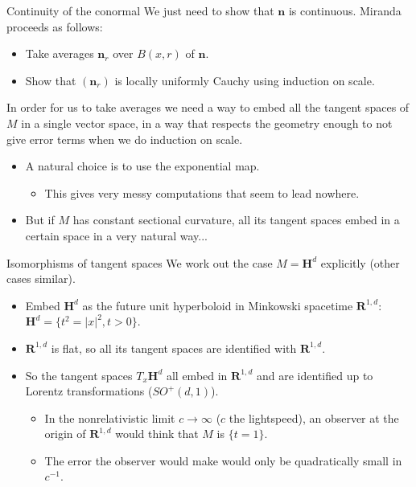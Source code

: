 \documentclass[10pt]{beamer}
\newcommand{\RR}{\mathbf{R}}
\newcommand{\Hyp}{\mathbf H}
\newcommand{\normal}{\mathbf n}
\begin{document}
\begin{frame}{Continuity of the conormal}
We just need to show that $\normal$ is continuous.
Miranda proceeds as follows:

\begin{itemize}
\item Take averages $\normal_r$ over $B(x, r)$ of $\normal$.
\item Show that $(\normal_r)$ is locally uniformly Cauchy using induction on scale.
\end{itemize}

In order for us to take averages we need a way to embed all the tangent spaces of $M$ in a single vector space, in a way that respects the geometry enough to not give error terms when we do induction on scale.
\begin{itemize}
\item A natural choice is to use the exponential map.
\begin{itemize} \item This gives very messy computations that seem to lead nowhere. \end{itemize}
\item But if $M$ has constant sectional curvature, all its tangent spaces embed in a certain space in a very natural way...
\end{itemize}
\end{frame}

\begin{frame}{Isomorphisms of tangent spaces}
We work out the case $M = \Hyp^d$ explicitly (other cases similar).
\begin{itemize}
\item Embed $\Hyp^d$ as the future unit hyperboloid in Minkowski spacetime $\RR^{1, d}$: $\Hyp^d = \{t^2 = |x|^2, t > 0\}$.
\item $\RR^{1, d}$ is flat, so all its tangent spaces are identified with $\RR^{1, d}$.
\item So the tangent spaces $T_x\Hyp^d$ all embed in $\RR^{1, d}$ and are identified up to Lorentz transformations ($SO^+(d, 1)$).
\begin{itemize}
\item In the nonrelativistic limit $c \to \infty$ ($c$ the lightspeed), an observer at the origin of $\RR^{1, d}$ would think that $M$ is $\{t = 1\}$.
\item The error the observer would make would only be quadratically small in $c^{-1}$.
\end{itemize}
\end{itemize}
\end{frame}
\end{document}
